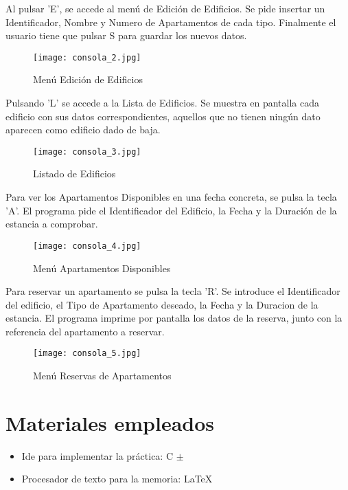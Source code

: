 \documentclass[12pt]{article}
\begin{document}
			Al pulsar 'E', se accede al menú de Edición de Edificios. Se pide insertar un Identificador, Nombre y Numero de Apartamentos de cada tipo. Finalmente el usuario tiene que pulsar S para guardar los nuevos datos.
			
			\begin{figure}[H]
				\centering
				\texttt{[image: consola\_2.jpg]}
				\caption{Menú Edición de Edificios}
				\label{fig:png}
			\end{figure}
			
			Pulsando 'L' se accede a la Lista de Edificios. Se muestra en pantalla cada edificio con sus datos correspondientes, aquellos que no tienen ningún dato aparecen como edificio dado de baja. 
			
			\begin{figure}[H]
				\centering
				\texttt{[image: consola\_3.jpg]}
				\caption{Listado de Edificios}
				\label{fig:png}
			\end{figure}
			
			
			Para ver los Apartamentos Disponibles en una fecha concreta, se pulsa la tecla 'A'.
			El programa pide el Identificador del Edificio, la Fecha y la Duración de la estancia a comprobar.
			
			\begin{figure}[H]
				\centering
				\texttt{[image: consola\_4.jpg]}
				\caption{Menú Apartamentos Disponibles}
				\label{fig:png}
			\end{figure}
			
			Para reservar un apartamento se pulsa la tecla 'R'.
			Se introduce el Identificador del edificio, el Tipo de Apartamento deseado, la Fecha y la Duracion de la estancia. El programa imprime por pantalla los datos de la reserva, junto con la referencia del apartamento a reservar.
			
			\begin{figure}[H]
				\centering
				\texttt{[image: consola\_5.jpg]}
				\caption{Menú Reservas de Apartamentos}
				\label{fig:png}
			\end{figure}
			
			
			
			
			\newpage
			
			\section{Materiales empleados}
			
				\begin{itemize}
				\item  Ide para implementar la práctica: C $\pm$ 
				\item  Procesador de texto para la memoria: \LaTeX 
			\end{itemize}

		
	
\end{document}
